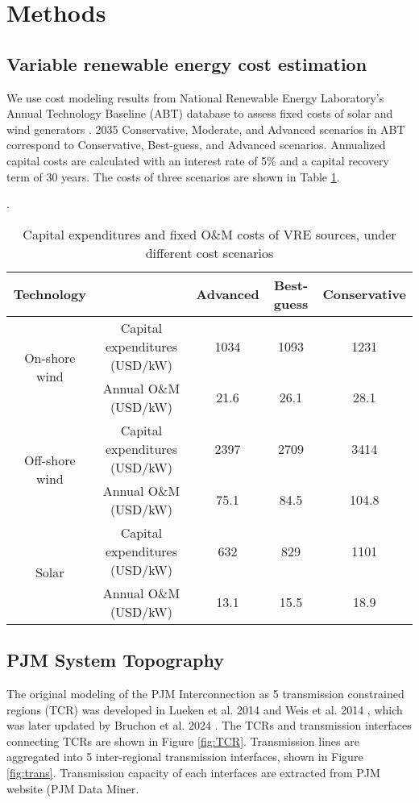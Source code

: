 \documentclass[9pt,twoside,lineno]{pnas-new}
\begin{document}
\section*{Methods}
\subsection{Variable renewable energy cost estimation}

We use cost modeling results from National Renewable Energy Laboratory's Annual Technology Baseline (ABT) database to assess fixed costs of solar and wind generators \cite{vimmerstedt_2022_2022}. 2035 Conservative, Moderate, and Advanced scenarios in ABT correspond to Conservative, Best-guess, and Advanced scenarios. Annualized capital costs are calculated with an interest rate of 5\% and a capital recovery term of 30 years. The costs of three scenarios are shown in Table \ref{tab:costs}.

\begin{table}[H]\label{fig:mix}
    \caption{Capital expenditures and fixed O\&M costs of VRE sources, under different cost scenarios \cite{vimmerstedt_2022_2022}}.
    \centering
    \begin{tabular}{ccccc}
    \hline
    Technology &  & Advanced & Best-guess & Conservative \\ \hline
    \multirow{2}{*}{On-shore wind} & Capital expenditures (USD/kW) & 1034 & 1093 & 1231 \\
     & Annual O\&M (USD/kW) & 21.6 & 26.1 & 28.1 \\
    \multirow{2}{*}{Off-shore wind} & Capital expenditures (USD/kW) & 2397 & 2709 & 3414 \\
     & Annual O\&M (USD/kW) & 75.1 & 84.5 & 104.8 \\
    \multirow{2}{*}{Solar} & Capital expenditures (USD/kW) & 632 & 829 & 1101 \\
     & Annual O\&M (USD/kW) & 13.1 & 15.5 & 18.9 \\ \cline{1-5} 
    \end{tabular}
    \label{tab:costs}
\end{table}

\subsection{PJM System Topography}

The original modeling of the PJM Interconnection as 5 transmission constrained regions (TCR) was developed in Lueken et al. 2014 and Weis et al. 2014 \cite{lueken_effects_2014,weis_estimating_2014}, which was later updated by Bruchon et al. 2024 \cite{bruchon_cleaning_2024}. The TCRs and transmission interfaces connecting TCRs are shown in Figure \ref{fig:TCR}. Transmission lines are aggregated into 5 inter-regional transmission interfaces, shown in Figure \ref{fig:trans}. Transmission capacity of each interfaces are extracted from PJM website (PJM Data Miner. 
\end{document}

